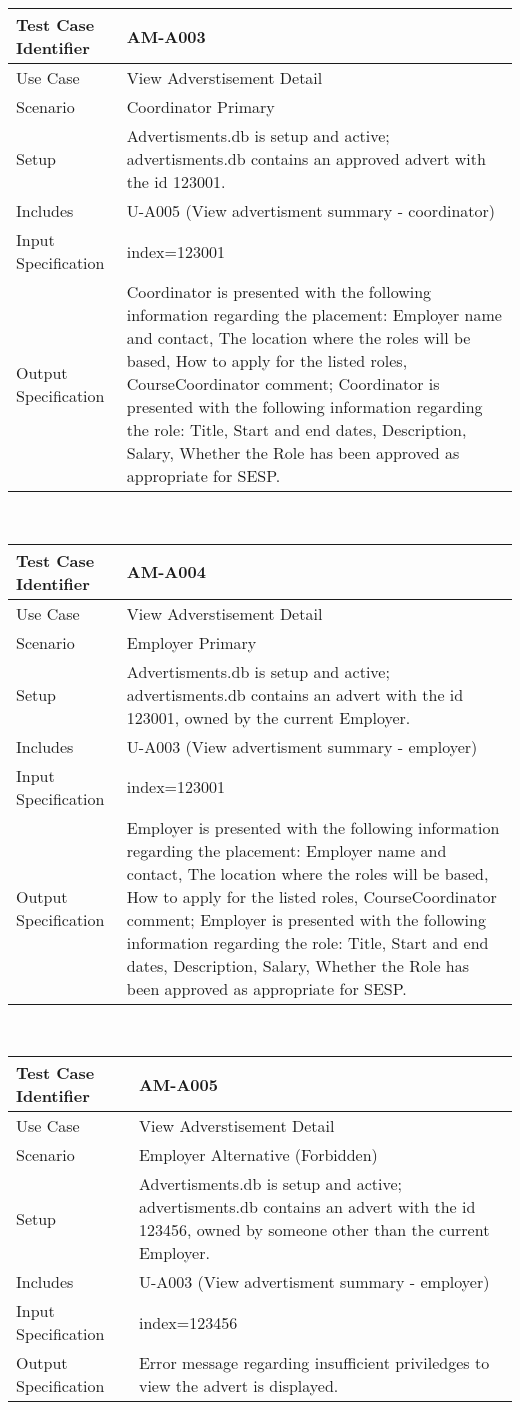 \documentclass{l3deliverable}
\begin{document}
\begin{tabular}{lp{10cm}}
\hline 
\textbf{Test Case Identifier} & AM-A003\tabularnewline
\hline 
\hline 
Use Case & View Adverstisement Detail \tabularnewline
\hline 
Scenario & Coordinator Primary \tabularnewline
\hline 
Setup & Advertisments.db is setup and active; advertisments.db contains an approved advert with the id 123001.\tabularnewline
\hline 
Includes & U-A005 (View advertisment summary - coordinator) \tabularnewline
\hline 
Input Specification & index=123001 \tabularnewline
\hline 
Output Specification & Coordinator is presented with the following information regarding the placement: Employer name and contact, The location where the roles will be based, How to apply for the listed roles, CourseCoordinator comment; Coordinator is presented with the following information regarding the role: Title, Start and end dates, Description, Salary, Whether the Role has been approved as appropriate for SESP.\tabularnewline
\hline 
\end{tabular}\\

\begin{tabular}{lp{10cm}}
\hline 
\textbf{Test Case Identifier} & AM-A004\tabularnewline
\hline 
\hline 
Use Case & View Adverstisement Detail \tabularnewline
\hline 
Scenario & Employer Primary \tabularnewline
\hline 
Setup & Advertisments.db is setup and active; advertisments.db contains an advert with the id 123001, owned by the current Employer.\tabularnewline
\hline 
Includes & U-A003 (View advertisment summary - employer)\tabularnewline
\hline 
Input Specification & index=123001 \tabularnewline
\hline 
Output Specification & Employer is presented with the following information regarding the placement: Employer name and contact, The location where the roles will be based, How to apply for the listed roles, CourseCoordinator comment; Employer is presented with the following information regarding the role: Title, Start and end dates, Description, Salary, Whether the Role has been approved as appropriate for SESP.\tabularnewline
\hline 
\end{tabular}\\

\begin{tabular}{lp{10cm}}
\hline 
\textbf{Test Case Identifier} & AM-A005\tabularnewline
\hline 
\hline 
Use Case & View Adverstisement Detail \tabularnewline
\hline 
Scenario & Employer Alternative (Forbidden) \tabularnewline
\hline 
Setup & Advertisments.db is setup and active; advertisments.db contains an advert with the id 123456, owned by someone other than the current Employer.\tabularnewline
\hline 
Includes & U-A003 (View advertisment summary - employer)\tabularnewline
\hline 
Input Specification & index=123456 \tabularnewline
\hline 
Output Specification & Error message regarding insufficient priviledges to view the advert is displayed.\tabularnewline
\hline 
\end{tabular}\\
\end{document}

